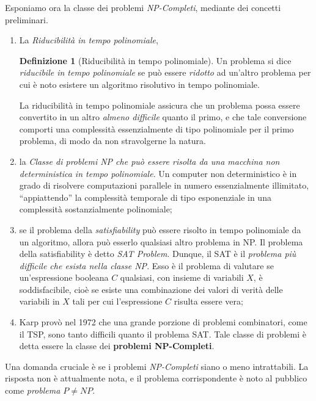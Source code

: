 \documentclass[10pt]{\classname}
\theoremstyle{newlinethm}
\theoremstyle{theorem}
\theoremstyle{definition}
\newtheorem{definizione}{Definizione}[section]
\theoremstyle{definition}
\theoremstyle{definition}
\theoremstyle{definition}
\begin{document}
Esponiamo ora la classe dei problemi \emph{NP-Completi}, mediante dei concetti preliminari.

\begin{enumerate}
    \item La \emph{Riducibilità in tempo polinomiale},
    \begin{definizione}[Riducibilità in tempo polinomiale]
        Un problema si dice \emph{riducibile in tempo polinomiale} se può essere \emph{ridotto} ad un'altro problema per cui è noto esistere un algoritmo risolutivo in tempo polinomiale.
    \end{definizione}
    La riducibilità in tempo polinomiale assicura che un problema possa essere convertito in un altro \emph{almeno difficile} quanto il primo, e che tale conversione comporti una complessità essenzialmente di tipo polinomiale per il primo problema, di modo da non stravolgerne la natura.
\item la \emph{Classe di problemi NP che può essere risolta da una macchina non deterministica in tempo polinomiale}. Un computer non deterministico è in grado di risolvere computazioni parallele in numero essenzialmente illimitato, ``appiattendo'' la complessità temporale di tipo esponenziale in una complessità sostanzialmente polinomiale;
\item se il problema della \emph{satisfiability} può essere risolto in tempo polinomiale da un algoritmo, allora può esserlo qualsiasi altro problema in NP. Il problema della satisfiability è detto \emph{SAT Problem}. Dunque, il SAT è il \emph{problema più difficile che esista nella classe NP}. Esso è il problema di valutare se un'espressione booleana $C$ qualsiasi, con insieme di variabili $X$, è soddisfacibile, cioè se esiste una combinazione dei valori di verità delle variabili in $X$ tali per cui l'espressione $C$ risulta essere vera;
\item Karp provò nel 1972 che una grande porzione di problemi combinatori, come il TSP, sono tanto difficili quanto il problema SAT. Tale classe di problemi è detta essere la classe dei \textbf{problemi NP-Completi}.
\end{enumerate}
Una domanda cruciale è se i problemi \emph{NP-Completi} siano o meno intrattabili. La risposta non è attualmente nota, e il problema corrispondente è noto al pubblico come \emph{problema $P \neq NP$}.
\end{document}
